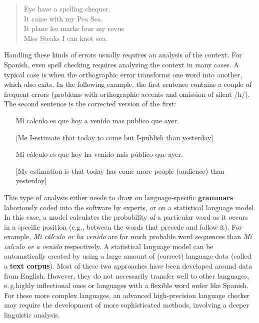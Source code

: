 \begin{multicols}{2}
\begin{quote}
  Eye have a spelling chequer,\\
  It came with my Pea Sea.\\
  It plane lee marks four my revue\\
  Miss Steaks I can knot sea.\cite{zar1}
\end{quote}

Handling these kinds of errors usually requires an analysis of the context. For Spanish, even spell checking requires analyzing the context in many cases. A typical case is when the orthographic error transforms one word into another, which also exits. In the following example, the first sentence contains a couple of frequent errors (problems with orthographic accents and omission of silent /h/). The second sentence is the corrected version of the first:

\begin{itemize}
  \item[] Mí calculo es que hoy a venido mas publico que ayer.
  \item[] [Me I-estimate that today to come but I-publish than yesterday]
  \item[] Mi cálculo es que hoy ha venido más público que ayer.
  \item[] [My estimation is that today has come more people (audience) than yesterday]
\end{itemize}

This type of analysis either needs to draw on language-specific \textbf{grammars} laboriously coded into the software by experts, or on a statistical language model. In this case, a model calculates the probability of a particular word as it occurs in a specific position (e.g., between the words that precede and follow it). For example, \textit{Mi cálculo or ha venido} are far much probable word sequences than \textit{Mí calculo or a venido} respectively. A statistical language model can be automatically created by using a large amount of (correct) language data (called a \textbf{text corpus}). Most of these two approaches have been developed around data from English. However, they do not necessarily transfer well to other languages, e.\,g.highly inflectional ones or languages with a flexible word order like Spanish. For these more complex languages, an advanced high-precision language checker may require the development of more sophisticated methods, involving a deeper linguistic analysis. 
\columnbreak



\end{multicols}
